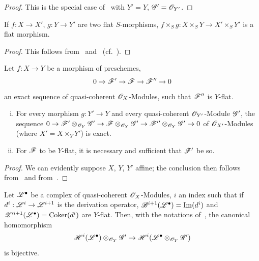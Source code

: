 \begin{proof}
This is the special case of~ with $Y'=Y$, $\mathscr{G}'=\mathscr{O}_{Y'}$.
\end{proof}

\begin{corollary}[2.1.7]
\label{IV.2.1.7}
If $f:X\to X'$, $g:Y\to Y'$ are two flat $S$-morphisms, $f\times_S g:X\times_S Y\to X'\times_S Y'$ is a flat morphism.
\end{corollary}

\begin{proof}
This follows from~ and~ (cf.~).
\end{proof}

\begin{proposition}[2.1.8]
\label{IV.2.1.8}
Let $f:X\to Y$ be a morphism of preschemes,
\[
  0 \to \mathscr{F}' \to \mathscr{F} \to \mathscr{F}'' \to 0
\]
an exact sequence of quasi-coherent $\mathscr{O}_X$-Modules, such that $\mathscr{F}''$ is $Y$-flat.
\begin{enumerate}[(i)]
  \item[\textup{(i)}] For every morphism $g:Y'\to Y$ and every quasi-coherent $\mathscr{O}_{Y'}$-Module $\mathscr{G}'$, the sequence
    $0\to\mathscr{F}'\otimes_{\mathscr{O}_Y}\mathscr{G}'\to\mathscr{F}\otimes_{\mathscr{O}_Y}\mathscr{G}'\to\mathscr{F}''\otimes_{\mathscr{O}_Y}\mathscr{G}'\to 0$ of $\mathscr{O}_{X'}$-Modules \textnormal{(}where $X'=X\times_Y Y'$\textnormal{)} is exact.
  \item For $\mathscr{F}$ to be $Y$-flat, it is necessary and sufficient that $\mathscr{F}'$ be so.
\end{enumerate}
\end{proposition}

\begin{proof}
We can evidently suppose $X$, $Y$, $Y'$ affine; the conclusion then follows from~ and from~.
\end{proof}

\begin{corollary}[2.1.9]
\label{IV.2.1.9}
Let $\mathscr{L}^\bullet$ be a complex of quasi-coherent $\mathscr{O}_X$-Modules, $i$ an index such that if $d^i:\mathscr{L}^i\to\mathscr{L}^{i+1}$ is the derivation operator, $\mathscr{B}^{i+1}(\mathscr{L}^\bullet)=\operatorname{Im}(d^i)$ and $\mathscr Z'^{i+1}(\mathscr{L}^\bullet)=\operatorname{Coker}(d^i)$ are $Y$-flat.
Then, with the notations of~, the canonical homomorphism
\[
  \mathscr{H}^i(\mathscr{L}^\bullet)\otimes_{\mathscr{O}_Y}\mathscr{G}' \to \mathscr{H}^i(\mathscr{L}^\bullet\otimes_{\mathscr{O}_Y}\mathscr{G}')
\]
is bijective.
\end{corollary}

